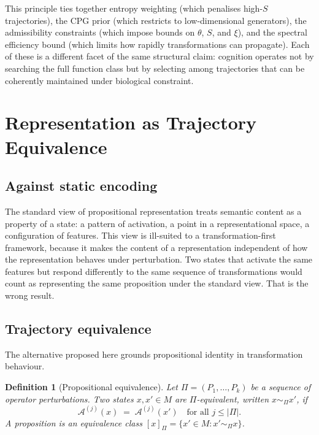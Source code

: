 \documentclass[12pt, a4paper]{article}
\newtheorem{definition}[theorem]{Definition}
\theoremstyle{remark}
\theoremstyle{definition}
\newcommand{\A}{\mathcal{A}}
\begin{document}
This principle ties together entropy weighting (which penalises high-$S$ trajectories),
the CPG prior (which restricts to low-dimensional generators), the admissibility constraints
(which impose bounds on $\theta$, $S$, and $\xi$), and the spectral efficiency bound (which
limits how rapidly transformations can propagate).  Each of these is a different facet of
the same structural claim: cognition operates not by searching the full function class but
by selecting among trajectories that can be coherently maintained under biological
constraint.

\section{Representation as Trajectory Equivalence}
\label{sec:representation}

\subsection{Against static encoding}

The standard view of propositional representation treats semantic content as a property of
a state: a pattern of activation, a point in a representational space, a configuration of
features.  This view is ill-suited to a transformation-first framework, because it makes
the content of a representation independent of how the representation behaves under
perturbation.  Two states that activate the same features but respond differently to the
same sequence of transformations would count as representing the same proposition under
the standard view.  That is the wrong result.

\subsection{Trajectory equivalence}

The alternative proposed here grounds propositional identity in transformation behaviour.

\begin{definition}[Propositional equivalence]
\label{def:equiv}
Let $\Pi = (P_1, \ldots, P_k)$ be a sequence of operator perturbations.  Two states
$x, x' \in M$ are \emph{$\Pi$-equivalent}, written $x \sim_\Pi x'$, if
\[
  \A^{(j)}(x) \;=\; \A^{(j)}(x') \quad \text{for all } j \le |\Pi|.
\]
A \emph{proposition} is an equivalence class $[x]_\Pi = \{x' \in M : x' \sim_\Pi x\}$.
\end{definition}
\end{document}
